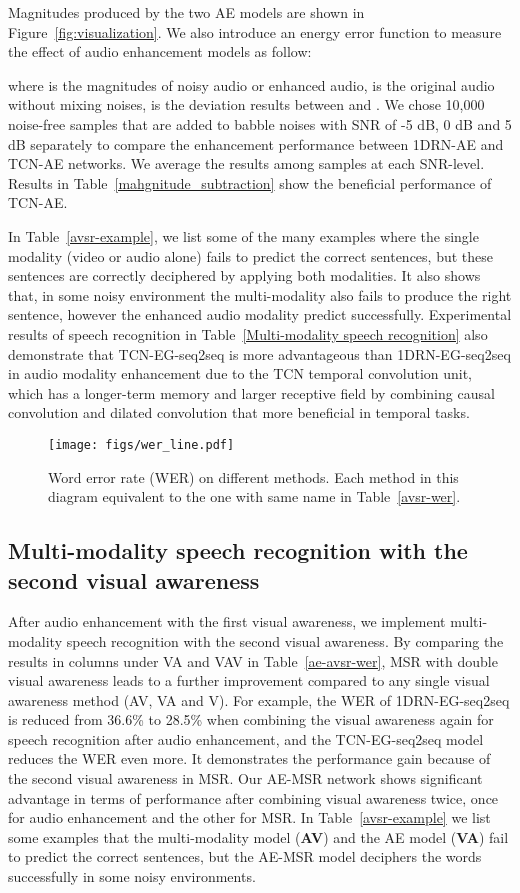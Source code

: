 \documentclass[10pt,twocolumn,letterpaper]{article}
\begin{document}
Magnitudes produced by the two AE models are shown in Figure~\ref{fig:visualization}. We also introduce an energy error function to measure the effect of audio enhancement models as follow: 

where  is the magnitudes of noisy audio or enhanced audio,  is the original audio without mixing
noises,  is the deviation results between  and . We chose 10,000 noise-free samples that are added to babble noises with SNR of -5 dB, 0 dB and 5 dB separately to compare the enhancement performance between 1DRN-AE and TCN-AE networks. We average the  results among samples at each SNR-level. Results in Table~\ref{mahgnitude_subtraction} show the beneficial performance of TCN-AE. 

In Table~\ref{avsr-example}, we list some of the many examples where the single modality (video or audio alone) fails to predict the correct sentences, but these sentences are correctly deciphered by applying both modalities. It also shows that, in some noisy environment the multi-modality also fails to produce the right sentence, however the enhanced audio modality predict successfully. Experimental results of speech recognition in Table~\ref{Multi-modality speech recognition} also demonstrate that TCN-EG-seq2seq is more advantageous than 1DRN-EG-seq2seq in audio modality enhancement due to the TCN temporal convolution unit, which has a longer-term memory and larger receptive field by combining causal convolution and dilated convolution that more beneficial in temporal tasks. 
\begin{figure}[t]
\centering
\texttt{[image: figs/wer\_line.pdf]}
\caption{Word error rate (WER) on different methods. Each method in this diagram equivalent to the one with same name in Table~\ref{avsr-wer}.}
\label{WER}
\end{figure}

\subsection{Multi-modality speech recognition with the second visual awareness}
After audio enhancement with the first visual awareness, we implement multi-modality speech recognition with the second visual awareness. By comparing the results in columns under VA and VAV in Table~\ref{ae-avsr-wer}, MSR with double visual awareness leads to a further improvement compared to any single visual awareness method (\eg AV, VA and V). For example, the WER of 1DRN-EG-seq2seq is reduced from 36.6\% to 28.5\% when combining the visual awareness again for speech recognition after audio enhancement, and the TCN-EG-seq2seq model reduces the WER even more. It demonstrates the performance gain because of the second visual awareness in MSR. Our AE-MSR network shows significant advantage in terms of performance after combining visual awareness twice, once for audio enhancement and the other for MSR. In Table~\ref{avsr-example} we list some examples that the multi-modality model ({\bf AV}) and the AE model ({\bf VA}) fail to predict the correct sentences, but the AE-MSR model deciphers the words successfully in some noisy environments. 
\end{document}
